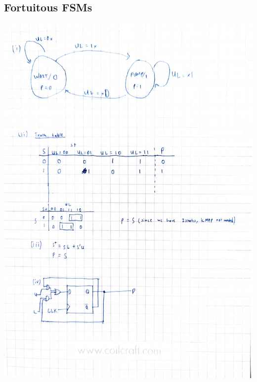 \documentclass{article}
\begin{document}
\begin{enumerate}[label=(\alph*)]
    \section{Fortuitous FSMs}
    \includegraphics[scale=0.75]{figures/7a sol.pdf}


\end{enumerate}
\end{document}
